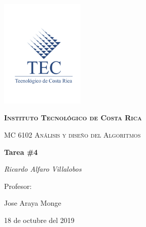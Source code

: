 \documentclass[12pt,a4paper]{article}
\begin{document}
\begin{titlepage}
	\centering
	\includegraphics[width=0.30\textwidth]{images/Teclogocompleto.jpg}\par\vspace{1cm}
	{\scshape\large \textbf{Instituto Tecnológico de Costa Rica }\par}
	\vspace{1cm}
	{\scshape\Large MC 6102 Análisis y diseño del Algoritmos\par}
	\vspace{1.5cm}
	{\Large\bfseries Tarea \#4\par}
	\vspace{2cm}
	{\Large\itshape Ricardo Alfaro Villalobos\par}
	\vfill
	Profesor:\par
	Jose Araya Monge\textsc{}

	\vfill

	{\large 18 de octubre del 2019\par}
\end{titlepage}
\end{document}
